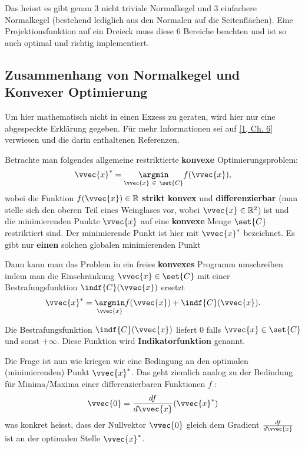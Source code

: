 \documentclass[
  british,
  12pt,
  paper=a4,
  twoside,
  titlepage=true,
  openright,
  abstract=on,
  toc=listofnumbered,
  numbers=noenddot,
  chapterprefix=true,
  headings=optiontohead,
  svgnames,
  dvipsnames]{scrreprt}
\begin{document}
Das heisst es gibt genau 3 nicht triviale Normalkegel und 3 einfachere
Normalkegel (bestehend lediglich aus den Normalen auf die
Seitenflächen). Eine Projektionsfunktion auf ein Dreieck muss diese 6
Bereiche beachten und ist so auch optimal und richtig implementiert.

\hypertarget{zusammenhang-von-normalkegel-und-konvexer-optimierung}{%
\subsection{Zusammenhang von Normalkegel und Konvexer
Optimierung}\label{zusammenhang-von-normalkegel-und-konvexer-optimierung}}

Um hier mathematisch nicht in einen Exzess zu geraten, wird hier nur
eine abgespeckte Erklärung gegeben. Für mehr Informationen sei auf
\protect\hyperlink{ref-nuetzig_thesis_2016}{{[}1, Ch. 6{]}} verwiesen
und die darin enthaltenen Referenzen.

Betrachte man folgendes allgemeine restriktierte \textbf{konvexe}
Optimierungsproblem:
\begin{align} \vvec{x}^* = \underset{\vvec{x} \ \in \ \set{C}}{\argmin} f(\vvec{x}), \label{eq:convexproblem} \end{align}
wobei die Funktion \(f(\vvec{x}) \in \mathbb{R}\) \textbf{strikt konvex}
und \textbf{differenzierbar} (man stelle sich den oberen Teil eines
Weinglases vor, wobei \(\vvec{x} \in \mathbb{R}^2\)) ist und die
minimierenden Punkte \(\vvec{x}\) auf eine \textbf{konvexe} Menge
\(\set{C}\) restriktiert sind. Der minimierende Punkt ist hier mit
\(\vvec{x}^*\) bezeichnet. Es gibt nur \textbf{einen} solchen globalen
minimierenden Punkt

Dann kann man das Problem in ein freies \textbf{konvexes} Programm
umschreiben indem man die Einschränkung \(\vvec{x} \in \set{C}\) mit
einer Bestrafungsfunktion \(\indf{C}(\vvec{x})\) ersetzt
\begin{align} \vvec{x}^* = \underset{\vvec{x}}{\argmin} f(\vvec{x}) + \indf{C}(\vvec{x}). \end{align}

Die Bestrafungsfunktion \(\indf{C}(\vvec{x})\) liefert \(0\) falls
\(\vvec{x} \in \set{C}\) und sonst \(+\infty\). Diese Funktion wird
\textbf{Indikatorfunktion} genannt.

Die Frage ist nun wie kriegen wir eine Bedingung an den optimalen
(minimierenden) Punkt \(\vvec{x}^*\). Das geht ziemlich analog zu der
Bedindung für Minima/Maxima einer differenzierbaren Funktionen \(f\) :
\begin{align} \vvec{0} = \frac{df}{d\vvec{x}}(\vvec{x}^*) \label{eq:optimality-difffunc} \end{align}
was konkret heisst, dass der Nullvektor \(\vvec{0}\) gleich dem Gradient
\(\frac{df}{d\vvec{x}}\) ist an der optimalen Stelle \(\vvec{x}^*\).
\end{document}
